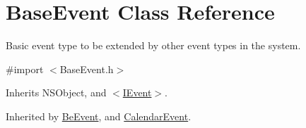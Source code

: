 \hypertarget{interface_base_event}{}\section{Base\+Event Class Reference}
\label{interface_base_event}


Basic event type to be extended by other event types in the system.  




{\ttfamily \#import $<$Base\+Event.\+h$>$}



Inherits N\+S\+Object, and \hyperlink{protocol_i_event-p}{$<$\+I\+Event$>$}.



Inherited by \hyperlink{interface_be_event}{Be\+Event}, and \hyperlink{interface_calendar_event}{Calendar\+Event}.

